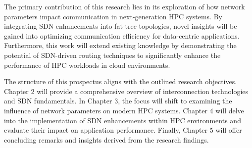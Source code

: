 The primary contribution of this research lies in its exploration of how network
parameters impact communication in next-generation HPC systems. By integrating
SDN enhancements into fat-tree topologies, novel insights will be gained into
optimizing communication efficiency for data-centric applications. Furthermore,
this work will extend existing knowledge by demonstrating the potential of
SDN-driven routing techniques to significantly enhance the performance of HPC
workloads in cloud environments.  

The structure of this prospectus aligns with
the outlined research objectives. Chapter 2 will provide a comprehensive
overview of interconnection technologies and SDN fundamentals. In Chapter 3, the
focus will shift to examining the influence of network parameters on modern HPC
systems. Chapter 4 will delve into the implementation of SDN enhancements within
HPC environments and evaluate their impact on application performance. Finally,
Chapter 5 will offer concluding remarks and insights derived from the research
findings.

